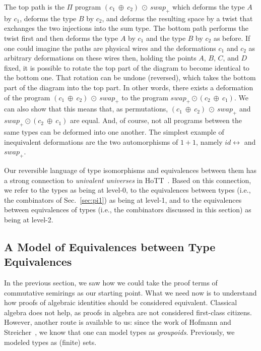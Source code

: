 \documentclass{article}
\newcommand{\swapp}{\mathit{swap}_+}
\newcommand{\idc}{\mathit{id}\!\!\leftrightarrow}
\begin{document}
The top path is the $\Pi$ program
$(c_1~\oplus~c_2)~\odot~\swapp$ which deforms the
type $A$ by $c_1$, deforms the type $B$ by $c_2$, and deforms the
resulting space by a twist that exchanges the two injections into the
sum type. The bottom path performs the twist first and then deforms
the type $A$ by $c_1$ and the type $B$ by $c_2$ as before. If one
could imagine the paths are physical wires and the deformations $c_1$
and $c_2$ as arbitrary deformations on these wires then, holding the
points $A$, $B$, $C$, and $D$ fixed, it is possible to rotate the top
part of the diagram to become identical to the bottom one. That
rotation can be undone (reversed), which takes the bottom
part of the diagram into the top part.  In other
words, there exists a deformation of the program
$(c_1~\oplus~c_2)~\odot~\swapp$ to the program
$\swapp \odot (c_2~\oplus~c_1)$. We can also show that this
means that, as permutations, $(c_1~\oplus~c_2)~\odot~\swapp$ and
$\swapp \odot (c_2~\oplus~c_1)$ are equal. And, of course, not
all programs between the same types can be deformed into one
another. The simplest example of inequivalent deformations
are the two automorphisms of $1+1$, namely $\idc$ and $\swapp$.

Our reversible language of type isomorphisms and equivalences between
them has a strong connection to \emph{univalent universes} in
HoTT~\cite{CARETTE20185}. Based on this connection, we refer to the
types as being at level-0, to the equivalences between types (i.e., the
combinators of Sec.~\ref{sec:pi1}) as being at level-1, and to the
equivalences between equivalences of types (i.e., the combinators
discussed in this section) as being at level-2. 

\subsection{A Model of Equivalences between Type Equivalences} 
 
In the previous section, we saw how we could take the proof
terms of commutative semirings as our starting point. What we need
now is to understand how proofs of algebraic identities should be
considered equivalent. Classical algebra does not help, as proofs
in algebra are not considered first-class citizens. However,
another route is available to us: since the work of 
Hofmann and Streicher~\cite{hofmann96thegroupoid}, we know that
one can model types as \emph{groupoids}.  Previously, we
modeled types as (finite) sets.
\end{document}
